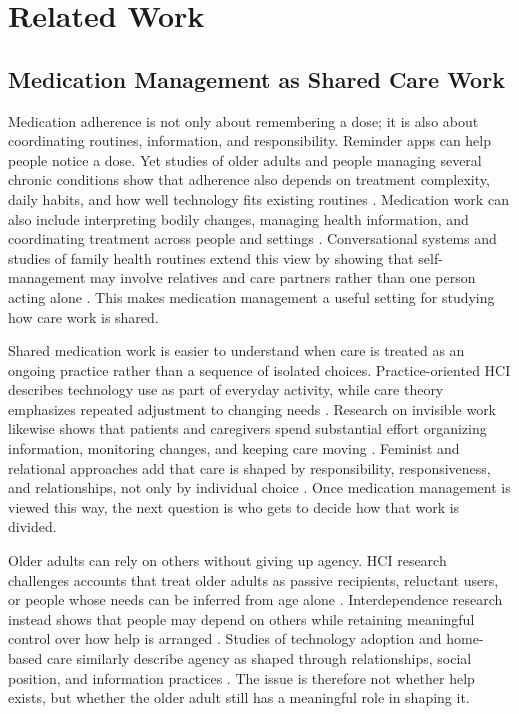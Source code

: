 \section{Related Work}

\subsection{Medication Management as Shared Care Work}

Medication adherence is not only about remembering a dose; it is also about coordinating routines, information, and responsibility. Reminder apps can help people notice a dose. Yet studies of older adults and people managing several chronic conditions show that adherence also depends on treatment complexity, daily habits, and how well technology fits existing routines \cite{27,35,107,108}. Medication work can also include interpreting bodily changes, managing health information, and coordinating treatment across people and settings \cite{8,9,54,85,119}. Conversational systems and studies of family health routines extend this view by showing that self-management may involve relatives and care partners rather than one person acting alone \cite{74,92,102,120}. This makes medication management a useful setting for studying how care work is shared.

Shared medication work is easier to understand when care is treated as an ongoing practice rather than a sequence of isolated choices. Practice-oriented HCI describes technology use as part of everyday activity, while care theory emphasizes repeated adjustment to changing needs \cite{61,80,112}. Research on invisible work likewise shows that patients and caregivers spend substantial effort organizing information, monitoring changes, and keeping care moving \cite{8,47,85,106}. Feminist and relational approaches add that care is shaped by responsibility, responsiveness, and relationships, not only by individual choice \cite{10,43,44,72}. Once medication management is viewed this way, the next question is who gets to decide how that work is divided.

Older adults can rely on others without giving up agency. HCI research challenges accounts that treat older adults as passive recipients, reluctant users, or people whose needs can be inferred from age alone \cite{11,41,48,58,59,64,66}. Interdependence research instead shows that people may depend on others while retaining meaningful control over how help is arranged \cite{13,30,78,101}. Studies of technology adoption and home-based care similarly describe agency as shaped through relationships, social position, and information practices \cite{56,86}. The issue is therefore not whether help exists, but whether the older adult still has a meaningful role in shaping it.

